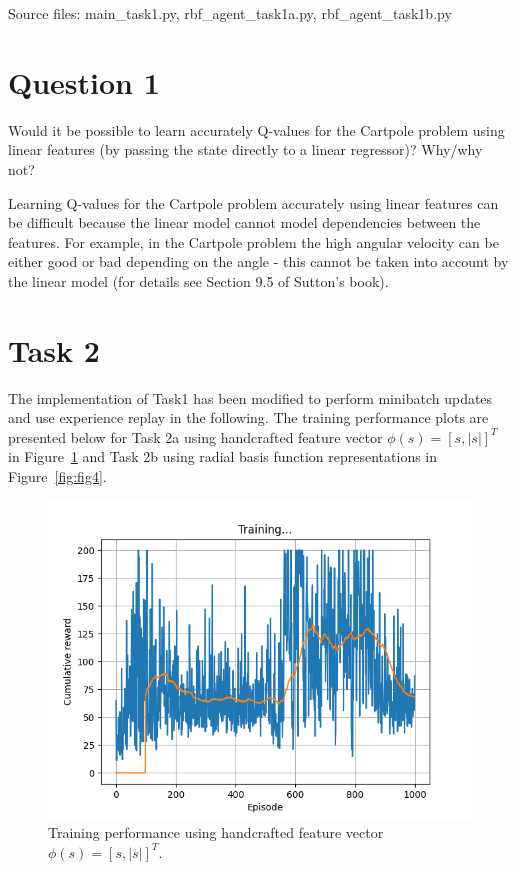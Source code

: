 \documentclass[12pt]{article}
\begin{document}
\noindent
Source files: main\_task1.py, rbf\_agent\_task1a.py, rbf\_agent\_task1b.py 


\section*{Question 1}

Would it be possible to learn accurately Q-values for the Cartpole
problem using linear features (by passing the state directly to a linear regressor)? Why/why
not?
\newline

Learning Q-values for the Cartpole problem accurately using linear features can be difficult because the linear model cannot model dependencies between the features.
For example, in the Cartpole problem the high angular velocity can be either good or bad depending on the angle - this cannot be taken into account by the linear model (for details see Section 9.5 of Sutton's book).

\pagebreak


\section*{Task 2}

The implementation of Task1 has been modified to perform minibatch updates and
use experience replay in the following. The training performance plots are presented below for Task 2a using handcrafted feature vector $\phi(s) = [s,|s|]^T$ in Figure~\ref*{fig:fig3} and Task 2b using radial basis function representations in Figure~\ref*{fig:fig4}.

\begin{figure}[h] 
	\centering  %
    \includegraphics[width=0.9\columnwidth]{img/Figure_3_task_2a_cumulative_reward.png}
	\caption{Training performance using handcrafted feature vector $\phi(s) = [s,|s|]^T$.}
	\label{fig:fig3}
\end{figure}
\end{document}
